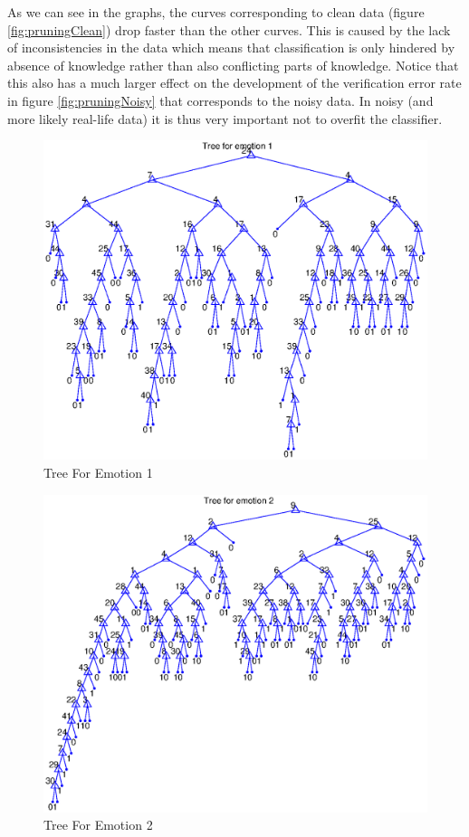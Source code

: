 \documentclass[10pt,a4paper]{article}
\begin{document}
As we can see in the graphs, the curves corresponding to clean data (figure \ref{fig:pruningClean}) drop faster than the other curves. This is caused by the lack of inconsistencies in the data which means that classification is only hindered by absence of knowledge rather than also conflicting parts of knowledge. Notice that this also has a much larger effect on the development of the verification error rate in figure \ref{fig:pruningNoisy} that corresponds to the noisy data. In noisy (and more likely real-life data) it is thus very important not to overfit the classifier.

\begin{figure}[!hb]
	\centering
	\includegraphics[width=\textwidth]{trees/tree1.eps}
     \caption{Tree For Emotion 1}
     \label{fig:tree1}
\end{figure}
\begin{figure}[!ht]
	\centering
	\includegraphics[width=\textwidth]{trees/tree2.eps}
     \caption{Tree For Emotion 2}
     \label{fig:tree2}
\end{figure}
\end{document}
